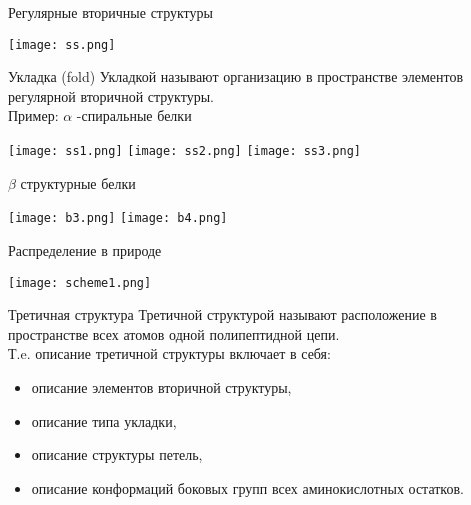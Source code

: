   \begin{frame}
{Регулярные вторичные структуры}
	\begin{center}
          \texttt{[image: ss.png]}
	  \end{center}
	\end{frame}

	\begin{frame}
{Укладка (fold)}
		Укладкой называют организацию в пространстве элементов регулярной вторичной структуры. \\
		Пример: $\alpha$ -спиральные белки\\
	\begin{center}
          \texttt{[image: ss1.png]}
          \texttt{[image: ss2.png]}
          \texttt{[image: ss3.png]}
	  \end{center}
	\end{frame}

\begin{frame}
{\texorpdfstring{$\beta$} - структурные белки}
	\begin{center}
								\begin{minipage}{\textwidth}
          \texttt{[image: b3.png]}
          \texttt{[image: b4.png]}
	  \end{minipage}
	  \end{center}
	\end{frame}

	\begin{frame}
{Распределение в природе}
	\begin{center}
          \texttt{[image: scheme1.png]}
	  \end{center}
	\end{frame}

	\begin{frame}
{Третичная структура}
		Третичной структурой называют расположение в пространстве всех атомов
		одной полипептидной цепи. \\
		Т.e. описание третичной структуры включает в себя:
		\begin{itemize}
			\item описание элементов вторичной структуры,
			\item описание типа укладки,
			\item описание структуры петель,
			\item описание конформаций боковых групп всех аминокислотных остатков.
			\end{itemize}
		\end{frame}
